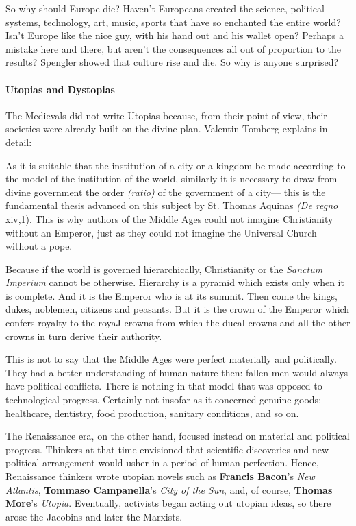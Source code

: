 So why should Europe die? Haven't Europeans created the science, political systems, technology, art, music, sports that have so enchanted the entire world? Isn't Europe like the nice guy, with his hand out and his wallet open? Perhaps a mistake here and there, but aren't the consequences all out of proportion to the results? Spengler showed that culture rise and die. So why is anyone surprised?

\paragraph{Utopias and Dystopias}
The Medievals did not write Utopias because, from their point of view, their societies were already built on the divine plan. Valentin Tomberg explains in detail:

\begin{quotex}
As it is suitable that the institution of a city or a kingdom be made according to the model of the institution of the world, similarly it is necessary to draw from divine government the order \emph{(ratio)} of the government of a city— this is the fundamental thesis advanced on this subject by St. Thomas Aquinas\emph{ (De regno} xiv,1). This is why authors of the Middle Ages could not imagine Christianity without an Emperor, just as they could not imagine the Universal Church without a pope.

Because if the world is governed hierarchically, Christianity or the \emph{Sanctum Imperium} cannot be otherwise. Hierarchy is a pyramid which exists only when it is complete. And it is the Emperor who is at its summit. Then come the kings, dukes, noblemen, citizens and peasants. But it is the crown of the Emperor which confers royalty to the royaJ crowns from which the ducal crowns and all the other crowns in turn derive their authority. 

\end{quotex}
This is not to say that the Middle Ages were perfect materially and politically. They had a better understanding of human nature then: fallen men would always have political conflicts. There is nothing in that model that was opposed to technological progress. Certainly not insofar as it concerned genuine goods: healthcare, dentistry, food production, sanitary conditions, and so on.

The Renaissance era, on the other hand, focused instead on material and political progress. Thinkers at that time envisioned that scientific discoveries and new political arrangement would usher in a period of human perfection. Hence, Renaissance thinkers wrote utopian novels such as \textbf{Francis Bacon}'s \emph{New Atlantis}, \textbf{Tommaso Campanella}'s \emph{City of the Sun}, and, of course, \textbf{Thomas More}'s \emph{Utopia}. Eventually, activists began acting out utopian ideas, so there arose the Jacobins and later the Marxists.

